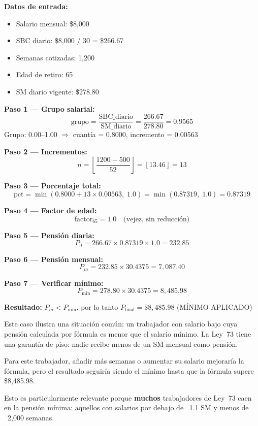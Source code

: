 \documentclass[11pt,a4paper]{report}
\begin{document}
\begin{tcolorbox}[colback=blue!5!white, colframe=blue!75!black, title=\textbf{Definici\'on Formal: Traza Num\'erica Completa}, breakable]
\textbf{Datos de entrada:}
\begin{itemize}
  \item Salario mensual: \$8,000
  \item SBC diario: \$8,000 / 30 = \$266.67
  \item Semanas cotizadas: 1,200
  \item Edad de retiro: 65
  \item SM diario vigente: \$278.80
\end{itemize}

\textbf{Paso 1 --- Grupo salarial:}
\[
  \text{grupo} = \frac{\text{SBC\_diario}}{\text{SM\_diario}} = \frac{266.67}{278.80} = 0.9565
\]
Grupo: 0.00--1.00 $\Rightarrow$ cuant\'ia = 0.8000, incremento = 0.00563

\textbf{Paso 2 --- Incrementos:}
\[
  n = \left\lfloor \frac{1200 - 500}{52} \right\rfloor = \left\lfloor 13.46 \right\rfloor = 13
\]

\textbf{Paso 3 --- Porcentaje total:}
\[
  \text{pct} = \min(0.8000 + 13 \times 0.00563,\; 1.0) = \min(0.87319,\; 1.0) = 0.87319
\]

\textbf{Paso 4 --- Factor de edad:}
\[
  \text{factor}_{65} = 1.0 \quad \text{(vejez, sin reducci\'on)}
\]

\textbf{Paso 5 --- Pensi\'on diaria:}
\[
  P_d = 266.67 \times 0.87319 \times 1.0 = 232.85
\]

\textbf{Paso 6 --- Pensi\'on mensual:}
\[
  P_m = 232.85 \times 30.4375 = 7,087.40
\]

\textbf{Paso 7 --- Verificar m\'inimo:}
\[
  P_{\min} = 278.80 \times 30.4375 = 8,485.98
\]

\textbf{Resultado:} $P_m < P_{\min}$, por lo tanto $P_{\text{final}} = \$8,485.98$ (M\'INIMO APLICADO)
\end{tcolorbox}

\begin{tcolorbox}[colback=green!5!white, colframe=green!50!black, title=\textbf{Intuici\'on}]
Este caso ilustra una situaci\'on com\'un: un trabajador con salario bajo cuya pensi\'on calculada por f\'ormula es menor que el salario m\'inimo. La Ley~73 tiene una garant\'ia de piso: nadie recibe menos de un SM mensual como pensi\'on.

Para este trabajador, a\~nadir m\'as semanas o aumentar su salario mejorar\'ia la f\'ormula, pero el resultado seguir\'ia siendo el m\'inimo hasta que la f\'ormula supere \$8,485.98.

Esto es particularmente relevante porque \textbf{muchos} trabajadores de Ley~73 caen en la pensi\'on m\'inima: aquellos con salarios por debajo de ~1.1 SM y menos de ~2,000 semanas.
\end{tcolorbox}
\end{document}
